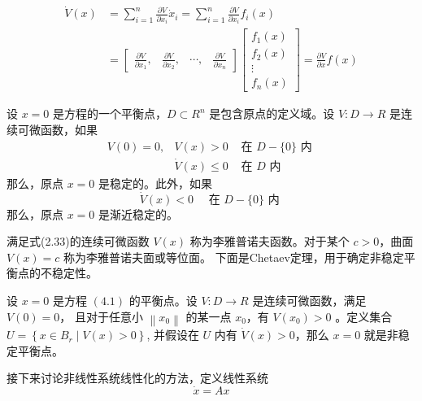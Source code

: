 \begin{equation}
    \begin{aligned}
    \dot{V}(x) & =\sum_{i=1}^n \frac{\partial V}{\partial x_i} \dot{x}_i=\sum_{i=1}^n \frac{\partial V}{\partial x_i} f_i(x) \\
    & =\left[\begin{array}{llll}
    \frac{\partial V}{\partial x_1},& \frac{\partial V}{\partial x_2},& \cdots,& \frac{\partial V}{\partial x_n}
    \end{array}\right]\left[\begin{array}{c}
    f_1(x) \\
    f_2(x) \\
    \vdots \\
    f_n(x)
    \end{array}\right]=\frac{\partial V}{\partial x} f(x)
    \end{aligned}
\end{equation}
\begin{theorem}
    设 $x=0$ 是方程的一个平衡点，$D \subset R^n$ 是包含原点的定义域。设 $V: D \rightarrow R$ 是连续可微函数，如果
    \begin{equation}
        \begin{array}{lll}
        V(0)=0,& V(x)>0 & \text { 在 } D-\{0\} \text { 内 } \\
        & \dot{V}(x) \leqslant 0 & \text { 在 } D \text { 内 }
        \end{array}
    \end{equation}
    那么，原点 $x=0$ 是稳定的。此外，如果
    \begin{equation}
        \dot{V}(x)<0 \quad \text { 在 } D-\{0\} \text { 内 }
    \end{equation}
    那么，原点 $x=0$ 是渐近稳定的。
\end{theorem}
满足式(2.33)的连续可微函数 $V(x)$ 称为李雅普诺夫函数。对于某个 $c>0$，曲面 $V(x)=c$ 称为李雅普诺夫面或等位面。
下面是Chetaev定理，用于确定非稳定平衡点的不稳定性。
\begin{theorem}
    设 $x=0$ 是方程 $(4.1)$ 的平衡点。设 $V: D \rightarrow R$ 是连续可微函数，满足 $V(0)=0$，
    且对于任意小 $\left\|x_0\right\|$ 的某一点 $x_0$，有 $V\left(x_0\right)>0$ 。定义集合 $U=\left\{x \in B_r \mid V(x)>0\right\}$,
    并假设在 $U$ 内有 $\dot{V}(x)>0$，那么 $x=0$ 就是非稳定平衡点。
\end{theorem}
接下来讨论非线性系统线性化的方法，定义线性系统
\begin{equation}
    \dot{x}=A x
\end{equation}
